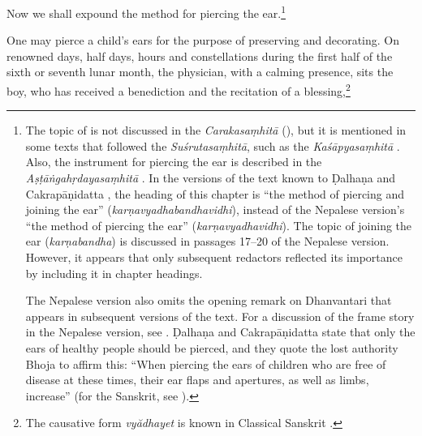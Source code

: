 \begin{translation}    
    
    
    \item [1] Now we shall expound the method for piercing the ear.\footnote{The
    topic of   is not discussed in the
    \emph{Carakasaṃhitā} (\cite[IB, 326, n.\,175]{meul-hist}), but it is mentioned
    in some texts that followed the \emph{Suśrutasaṃhitā}, such as the
    \emph{Kaśāpyasaṃhitā} \citep[IIA, 30]{meul-hist}. Also, the instrument for
    piercing the ear is described in the \emph{Aṣṭāṅgahṛdayasaṃhitā}
    . In the versions of the text known to Ḍalhaṇa
    \citep[76]{vulgate} and Cakrapāṇidatta \citep[125]{acar-1939}, the heading of
    this chapter is “the method of piercing and joining the ear”
    (\emph{karṇavyadhabandhavidhi}), instead of the Nepalese version's “the method
    of piercing the ear” (\emph{karṇavyadhavidhi}). The topic of joining the ear
    (\emph{karṇabandha}) is discussed in passages 17--20 of the Nepalese version.
    However, it appears that only subsequent redactors reflected its importance by
    including it in chapter headings.

 The Nepalese version also omits the opening remark on Dhanvantari that appears in
subsequent versions of the text. For a discussion of the frame story in the
Nepalese version, see \cite{birc-2021}. Ḍalhaṇa \citep[76]{vulgate} and
Cakrapāṇidatta \citep[125]{acar-1939} state that only the ears of healthy people
should be pierced, and they quote the lost authority Bhoja to affirm this: “When
piercing the ears of children who are free of disease at these times, their ear
flaps and apertures, as well as limbs, increase” (for the Sanskrit, see
\cite[76]{vulgate}).}

\item [2] One may pierce a child's ears for the purpose of preserving and
decorating. On renowned days, half days, hours and constellations during the first
half of the sixth or seventh lunar month, the physician, with a calming presence,
sits the boy, who has received a benediction and the recitation of a
blessing,\footnote{The causative form \emph{vy\u adhayet} is known in Classical
    Sanskrit \citep[166]{whit-root}.

}
\end{translation}
